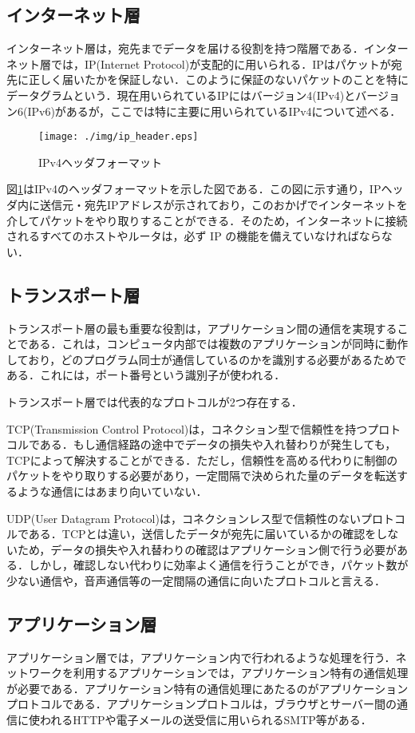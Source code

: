 \documentclass{thesis}
\begin{document}
\subsection*{インターネット層}\label{sec:ip}
インターネット層は，宛先までデータを届ける役割を持つ階層である．インターネット層では，IP(Internet Protocol)が支配的に用いられる．IPはパケットが宛先に正しく届いたかを保証しない．このように保証のないパケットのことを特にデータグラムという．現在用いられているIPにはバージョン4(IPv4)とバージョン6(IPv6)があるが，ここでは特に主要に用いられているIPv4について述べる．

\begin{figure}[H]
	\centering
	\texttt{[image: ./img/ip\_header.eps]}
	\caption{IPv4ヘッダフォーマット}
	\label{fig:ipv4}
\end{figure}
\noindent
図\ref{fig:ipv4}はIPv4のヘッダフォーマットを示した図である．この図に示す通り，IPヘッダ内に送信元・宛先IPアドレスが示されており，このおかげでインターネットを介してパケットをやり取りすることができる．そのため，インターネットに接続されるすべてのホストやルータは，必ず IP の機能を備えていなければならない．

\subsection*{トランスポート層}
トランスポート層の最も重要な役割は，アプリケーション間の通信を実現することである．これは，コンピュータ内部では複数のアプリケーションが同時に動作しており，どのプログラム同士が通信しているのかを識別する必要があるためである．これには，ポート番号という識別子が使われる．

トランスポート層では代表的なプロトコルが2つ存在する．

TCP(Transmission Control Protocol)は，コネクション型で信頼性を持つプロトコルである．もし通信経路の途中でデータの損失や入れ替わりが発生しても，TCPによって解決することができる．ただし，信頼性を高める代わりに制御のパケットをやり取りする必要があり，一定間隔で決められた量のデータを転送するような通信にはあまり向いていない．

UDP(User Datagram Protocol)は，コネクションレス型で信頼性のないプロトコルである．TCPとは違い，送信したデータが宛先に届いているかの確認をしないため，データの損失や入れ替わりの確認はアプリケーション側で行う必要がある．しかし，確認しない代わりに効率よく通信を行うことができ，パケット数が少ない通信や，音声通信等の一定間隔の通信に向いたプロトコルと言える．


\subsection*{アプリケーション層}
アプリケーション層では，アプリケーション内で行われるような処理を行う．ネットワークを利用するアプリケーションでは，アプリケーション特有の通信処理が必要である．アプリケーション特有の通信処理にあたるのがアプリケーションプロトコルである．アプリケーションプロトコルは，ブラウザとサーバー間の通信に使われるHTTPや電子メールの送受信に用いられるSMTP等がある．
\end{document}
